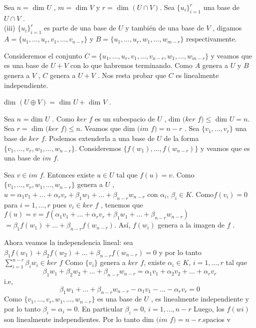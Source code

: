 	 	\begin{demo}
	 		\textnormal
	 		Sea $ n = $ dim $ U $ , $ m = $ dim $ V $ y $ r = $ dim $ (U \cap V ) $. Sea $ \{u_{i}\}^{r}_{i=1} $ una base de $ U \cap V $ . \\
	 		 (iii) $ \{u_{i}\}^{r}_{i=1} $ es parte de una base de $ U $ y también de una base de $ V $ , digamos $ A = \{u_{1} , \ldots , u_{r} , v_{1}, \ldots , v_{n-r} \} $ y $  B = \{u_{1} , \ldots , u_{r} , w_{1}, \ldots , w_{m-r} \}  $ respectivamente.
	 		
	 		Consideremos el conjunto $ C =  \{u_{1} , \ldots , u_{r} , v_{1}, \ldots , v_{n-r},w_{1},\ldots,w_{m-r} \}$  y
	 		veamos que es una base de $ U + V $ con lo que habremos terminando. Como $ A $ genera a $ U $ y $ B $ genera a $ V $ , $ C $ genera a $ U + V $ . Nos resta probar que $ C $ es linealmente independiente.
	 	\end{demo}
 		\begin{coro}
 			\normalfont dim $ (U \oplus V ) = $ dim $ U + $ dim $ V $ .
 		\end{coro}
 		\begin{demo}
 			\normalfont  Sea $ n $ = dim $ U $ . Como $ ker $ $ f $ es un subespacio de $ U $ , dim $ (ker  $ $f) \leq $  dim $ U = n $. Sea $ r = $ dim $ (ker  $ $f) \leq n$. Veamos que dim $ (im$ $ f )= n - r$ . Sea $ \{v_{1}, \ldots , v_{r} \} $ una base de $ ker$  $ f $. Podemos extenderla a una base de $ U $ de la forma $ \{v_{1} , \ldots , v_{r} , w_{1} , \ldots , w_{n-r} \} $. Consideremos $ \{f(w_{1} ), \ldots , f(w_{n-r} )\} $ y veamos que es una base de $ im $ $ f $.
 		\end{demo}
 		Sea $ v \in im $ $ f $. Entonces existe $ u \in U $ tal que $ f(u) = v. $ Como $ \{v_{1} , \ldots , v_{r} , w_{1} , \ldots , w_{n-r} \} $ genera a $ U $ , $ u = \alpha_{1}v_{1} + \ldots + \alpha_{r} v_{r} + \beta_{1} w_{1} +\ldots + \beta_{n-r} w_{n-r} $ con $ \alpha_{i} $, $ \beta_{i} \in K $. Como$  f(v_{i}) = 0 $ para $ i = 1, \ldots , r $ pues $ v_{i} \in ker $ $ f $ , tenemos que $ f(u) =
 		v = f (\alpha_{1} v_{1} + \ldots+ \alpha_{r} v_{r} + \beta_{1} w_{1} + \ldots+ \beta_{n-r} w_{n-r} )$\\$ = \beta_{1} f(w_{1}) + \ldots + \beta_{n-r}  f(w_{n-r}) $.
 		Así, $ f(w_{i}) $ genera a la imagen de $ f $ .
 		
 		Ahora veamos la independencia lineal:  sea $\beta_{1}f(w_{1})+\beta_{2}f(w_{2})+\ldots+\beta_{n-r}f(w_{n-r}) = 0$ y por lo tanto $ \sum_{i=1}^{n-r} \beta_{i}w_{i} \in ker$ $ f $ Como $ \{v_{i}\} $ genera a $ ker $ $ f $, existe $\alpha_{i} \in K$, $ i = 1,\ldots,r $ tal que 
 		\[ \beta_{1}w_{1}+\beta_{2}w_{2}+\ldots+\beta_{n-r}w_{n-r} = \alpha_{1} v_{1} + \alpha_{2} v_{2} + \ldots+\alpha_{r} v_{r} \]
 		i.e,
 		\[ \beta_{1}w_{1}+\ldots+\beta_{n-r}w_{n-r} - \alpha_{1} v_{1} - \ldots-\alpha_{r} v_{r} = 0\]
 		Como $ \{v_{1} , \ldots, v_{r} , w_{1}, \ldots, w_{n-r} \} $ es una base de $U$ , es linealmente independiente y por lo tanto $ \beta_{i} = \alpha_{i} = 0 $. En particular $ \beta_{i} = 0 $, $ i = 1,\ldots, n-r $  Luego, los $ f(wi ) $ son linealmente independientes. Por lo tanto dim $ (im $ $ f ) = n - r $.spacios v
 		
